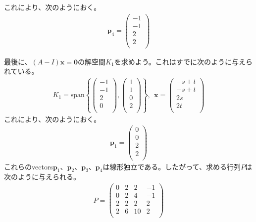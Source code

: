 \documentclass[dvipdfmx]{jsarticle}
\begin{document}
これにより、次のようにおく。
\begin{align*}
\mathbf{p}_{4} = \begin{pmatrix}
 - 1 \\
 - 1 \\
2 \\
2 \\
\end{pmatrix}
\end{align*}\par
最後に、$(A - I)\mathbf{x} = \mathbf{0}$の解空間$K_{1}$を求めよう。これはすでに次のように与えられている。
\begin{align*}
K_{1} = {\mathrm{span}}\left\{ \begin{pmatrix}
 - 1 \\
 - 1 \\
2 \\
0 \\
\end{pmatrix},\begin{pmatrix}
1 \\
1 \\
0 \\
2 \\
\end{pmatrix} \right\},\ \ \mathbf{x} = \begin{pmatrix}
 - s + t \\
 - s + t \\
2s \\
2t \\
\end{pmatrix}
\end{align*}
これにより、次のようにおく。
\begin{align*}
\mathbf{p}_{1} = \begin{pmatrix}
0 \\
0 \\
2 \\
2 \\
\end{pmatrix}
\end{align*}
これらのvectors$\mathbf{p}_{1}$、$\mathbf{p}_{2}$、$\mathbf{p}_{3}$、$\mathbf{p}_{4}$は線形独立である。したがって、求める行列$P$は次のように与えられる。
\begin{align*}
P = \begin{pmatrix}
0 & 2 & 2 & - 1 \\
0 & 2 & 4 & - 1 \\
2 & 2 & 2 & 2 \\
2 & 6 & 10 & 2 \\
\end{pmatrix}
\end{align*}
\end{document}

